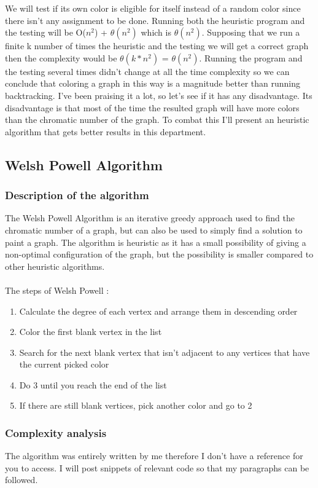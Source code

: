 \documentclass[runningheads]{llncs}
\begin{document}
We will test if its own color is eligible for itself instead of a random color since there isn't any
assignment to be done.
Running both the heuristic program and the testing
will be O($n^2$) + $\theta(n^2)$ which is $\theta(n^2)$. Supposing that we run a finite k number of
times the heuristic and the testing we will get a correct graph then the complexity would be
$\theta(k * n^2)$ = $\theta(n^2)$. Running the program and the testing several times didn't
change at all the time complexity so we can conclude that coloring a graph in this way is a
magnitude better than running backtracking.
I've been praising it a lot, so let's see if it has any disadvantage. Its disadvantage is
that most of the time the resulted graph will have more colors than the chromatic number of the
graph. To combat this I'll present an heuristic algorithm that gets better results in this
department.

\subsection{Welsh Powell Algorithm}
\subsubsection{Description of the algorithm}
The Welsh Powell Algorithm is an iterative greedy approach used to find the chromatic number of a graph, but
can also be used to simply find a solution to paint a graph.
The algorithm is heuristic as it has a small possibility of giving a non-optimal configuration of the graph, but
the possibility is smaller compared to other heuristic algorithms.
\\
\\
The steps of Welsh Powell \cite{ref_url3} :
\begin{enumerate}
	\item Calculate the degree of each vertex and arrange them in descending order
	\item Color the first blank vertex in the list
	\item Search for the next blank vertex that isn't adjacent to any vertices that have the current picked color
	\item Do 3 until you reach the end of the list
	\item If there are still blank vertices, pick another color and go to 2
\end{enumerate}
\subsubsection{Complexity analysis}
The algorithm was entirely written by me therefore I don't have a reference for you to access. I will post
snippets of relevant code so that my paragraphs can be followed.
\end{document}
